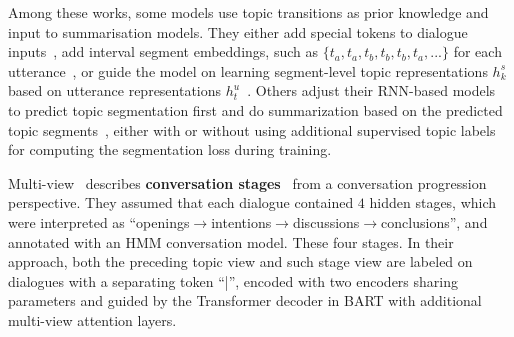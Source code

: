 Among these works, some models use topic transitions as prior knowledge and input to summarisation models. They either add special tokens to dialogue inputs~\cite{chen2020multi,feng2021language}, add interval segment embeddings, such as $\{t_a, t_a, t_b, t_b, t_b, t_a,...\}$ for each utterance~\cite{qi2021improving}, or guide the model on learning segment-level topic representations $h_k^s$ based on utterance representations $h_t^u$~\cite{zheng2020abstractive}.
Others adjust their RNN-based models to predict topic segmentation first and do summarization based on the predicted topic segments~\cite{liu2019topic,li2019keep}, either with or without using additional supervised topic labels for computing the segmentation loss during training. 

Multi-view~\cite{chen2020multi} describes \textbf{conversation stages}~\cite{althoff2016large} from a conversation progression perspective. They assumed that each dialogue contained $4$ hidden stages, which were interpreted as ``openings$\rightarrow$intentions$\rightarrow$discussions$\rightarrow$conclusions'', and annotated with an HMM conversation model. These four stages. In their approach, both the preceding topic view and such stage view are labeled on dialogues with a separating token ``|'', encoded with two encoders sharing parameters and guided by the Transformer decoder in BART with additional multi-view attention layers. 

